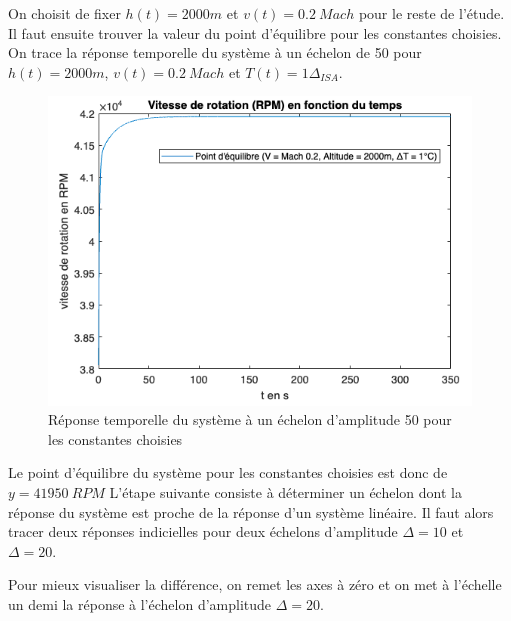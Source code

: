 \documentclass[12pt]{report}
\begin{document}
On choisit de fixer $h(t) = 2000m$ et $v(t) = 0.2 ~ Mach$ pour le reste de l'étude.
Il faut ensuite trouver la valeur du point d'équilibre pour les constantes choisies.
On trace la réponse temporelle du système à un échelon de 50 pour $h(t) = 2000m$, 
$v(t) = 0.2 ~ Mach$ et $T(t) = 1\Delta_{ISA}$.

\begin{figure}[!h]
  \vspace{1cm}
  \centering
  \includegraphics[scale=0.7]{fig/step_response_equilibre.png}
  \caption{Réponse temporelle du système à un échelon d'amplitude 50 pour les constantes choisies}
  \vspace{0.5cm}
\end{figure}

Le point d'équilibre du système pour les constantes choisies est donc de $y = 41950 ~ RPM$
L'étape suivante consiste à déterminer un échelon dont la réponse du système est 
proche de la réponse d'un système linéaire. Il faut alors tracer deux réponses indicielles
pour deux échelons d'amplitude $\Delta = 10$ et $\Delta = 20$.

Pour mieux visualiser la différence, on remet les axes à zéro et on met à l'échelle
un demi la réponse à l'échelon d'amplitude $\Delta = 20$.
\end{document}
